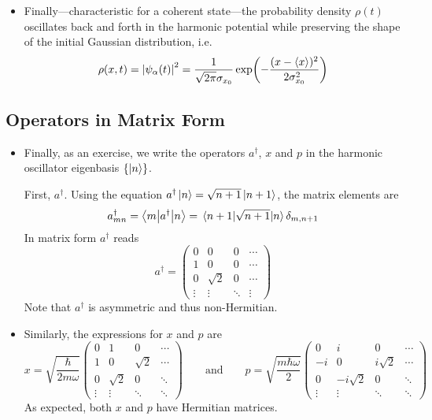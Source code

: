 \documentclass[11pt, a4paper]{article}
\newcommand{\eqtext}[1]{\qquad \text{#1} \qquad}
\newcommand{\Herm}{Hermitian\xspace}
\newcommand{\bmel}[3]{\big \langle {#1} \big | {#2} \big | {#3} \big \rangle}  %
\begin{document}
\begin{itemize}
	\item Finally---characteristic for a coherent state---the probability density $ \rho(t) $ oscillates back and forth in the harmonic potential while preserving the shape of the initial Gaussian distribution, i.e.
	\begin{equation*}
		\rho(x, t) = \abs{\psi_{\alpha}(t)}^{2} = \frac{1}{\sqrt{2\pi}\sigma_{x_{0}}}\exp(-\frac{(x - \ev{x})^{2}}{2 \sigma_{x_{0}}^{2}})
	\end{equation*}
	
\end{itemize}

\subsection{Operators in Matrix Form}
\begin{itemize}
	\item Finally, as an exercise, we write the operators $ a^{\dagger} $, $ x $ and $ p $ in the harmonic oscillator eigenbasis $ \{\ket{n} \} $. 
	
	First, $ a^{\dagger} $. Using the equation $ a^{\dagger}\ket{n} = \sqrt{n+1}\ket{n+1} $, the matrix elements are 
	\begin{equation*}
		a^{\dagger}_{mn} = \bmel{m}{a^{\dagger}}{n} = \mel{n+1}{\sqrt{n+1}}{n}\delta_{m, n+1}
	\end{equation*}
	In matrix form $ a^{\dagger} $ reads
	\begin{equation}
	a^{\dagger} =
	\begin{pmatrix}
	0 & 0 & 0 & \cdots\\
	1 & 0 & 0 & \cdots\\
	0 & \sqrt{2} & 0 & \cdots\\
	\vdots & \vdots & \ddots & \vdots
	\end{pmatrix}
	\end{equation}
	Note that $ a^{\dagger} $ is asymmetric and thus non-\Herm. 
	
	\item Similarly, the expressions for $ x $ and $ p $ are
	\begin{equation*}
		x = \sqrt{\frac{\hbar}{2m\omega}} 
		\begin{pmatrix}
		0 & 1 & 0 & \cdots\\
		1 & 0 & \sqrt{2} & \cdots\\
		0 & \sqrt{2} & 0 & \ddots\\
		\vdots & \vdots & \ddots & \ddots
		\end{pmatrix}
		\eqtext{and}
		p = \sqrt{\frac{m\hbar \omega}{2}} 
		\begin{pmatrix}
		0 & i & 0 & \cdots\\
		-i & 0 & i\sqrt{2} & \cdots\\
		0 & -i\sqrt{2} & 0 & \ddots\\
		\vdots & \vdots & \ddots & \ddots
		\end{pmatrix}
	\end{equation*}
	As expected, both $ x $ and $ p $ have \Herm matrices.
\end{itemize}
\end{document}
